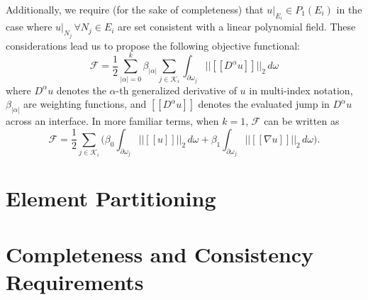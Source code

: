 \documentclass[11pt]{article} %
\begin{document}
Additionally, we require (for the sake of completeness) that $u|_{E_i} \in P_1 (E_i)$ in the case where $u|_{N_j} \, \forall N_j \in E_i$ are set consistent with a linear polynomial field. These considerations lead us to propose the following objective functional:
\begin{equation}
	\mathcal{F} = \frac{1}{2} \sum_{|\alpha| = 0}^k \beta_{|\alpha|} \sum_{j \in \mathcal{K}_i} \int_{\partial \omega_j} \big|\big| [\![ D^{\alpha} u ]\!] \big|\big|_2 \, d \omega
\end{equation}
where $D^{\alpha} u$ denotes the $\alpha$-th generalized derivative of $u$ in multi-index notation, $\beta_{|\alpha|}$ are weighting functions, and $[\![ D^{\alpha} u ]\!]$ denotes the evaluated jump in $D^{\alpha} u$ across an interface. In more familiar terms, when $k = 1$, $\mathcal{F}$ can be written as
\begin{equation}
	\mathcal{F} = \frac{1}{2} \sum_{j \in \mathcal{K}_i} \bigg( \beta_0 \int_{\partial \omega_j} \big|\big| [\![ u ]\!] \big|\big|_2 \, d \omega + \beta_1 \int_{\partial \omega_j} \big|\big|  [\![ \nabla u ]\!] \big|\big|_2 \, d \omega \bigg).
\end{equation}



\section{Element Partitioning}

\section{Completeness and Consistency Requirements}
\end{document}
